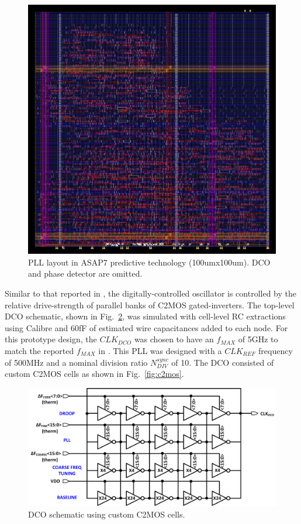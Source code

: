 \documentclass[twoside,9pt,journal,letterpage]{IEEEtran}
\begin{document}
\begin{figure}[h]
	\centering
	\includegraphics[width=0.7\columnwidth]{pnr3.png}
	\caption{PLL layout in ASAP7 predictive technology (100umx100um). DCO and phase detector are omitted.}
	\label{fig:layout}
\end{figure}

Similar to that reported in \cite{hashimoto2018}, the digitally-controlled oscillator is controlled by the relative drive-strength of parallel banks of C2MOS gated-inverters. The top-level DCO schematic, shown in Fig.\ \ref{fig:dco}, was simulated with cell-level RC extractions using Calibre and 60fF of estimated wire capacitances added to each node. For this prototype design, the $CLK_{DCO}$ was chosen to have an $f_{MAX}$ of 5GHz to match the reported $f_{MAX}$ in \cite{hashimoto2018}. This PLL was designed with a $CLK_{REF}$ frequency of 500MHz and a nominal division ratio $N_{DIV}^{sync}$ of 10. The DCO consisted of custom C2MOS cells as shown in Fig.\ \ref{fig:c2mos}. 

\begin{figure}[h]
	\centering
	\includegraphics[width=0.9\columnwidth]{fig_dco}
	\caption{DCO schematic using custom C2MOS cells.}
	\label{fig:dco}
\end{figure}
\end{document}
